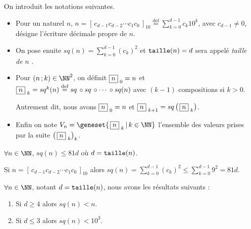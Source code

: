 On introduit les notations suivantes.
\begin{itemize}[label = \textbullet]
	\item Pour un naturel $n$,
	$\displaystyle      n =  \left[ \, c_{d-1} c_{d-2} \cdots c_1 c_0 \, \right]_{10} 
	\stackrel{\text{def}}{=} \sum_{k=0}^{d-1} c_k 10^k$,
	avec $c_{d-1} \neq 0$, désigne l'écriture décimale propre de $n$.
	
	\item On pose enuite
	$\displaystyle sq(n) = \sum_{k=0}^{d-1} (c_k)^2$
	et
	$\operatorname{\text{\normalfont\texttt{taille}}}(n) = d$ sera appelé \emph{\og taille de $n$ \fg}.


	\item Pour $(n \,; k) \in \NN^2$, on définit 
	$  \fbox{$n$}_{\,\,0} = n$
	et
	$  \fbox{$n$}_{\,\,k} = sq^k(n)
	\stackrel{\text{def}}{=} sq \,\circ sq \,\circ \cdots \,\circ sq(n)$ avec $(k-1)$ compositions si $k > 0$.
	
	
	\smallskip\noindent
	Autrement dit, nous avons
	$\fbox{$n$}_{\,\,0} = n$
	et
	$\fbox{$n$}_{\,\,k+1} = sq \left( \, \fbox{$n$}_{\,\,k} \right)$.


	\item Enfin on note
	$V_n = \geneset{ \, \sqseq{n}{k} \, | \, k \in \NN }$
	l'ensemble des valeurs prises par la suite $\left( \, \fbox{$n$}_{\,\,k} \right)_k$.
\end{itemize}



\bigskip

\begin{fact}
	$\forall n \in \NN$, $sq(n) \leqslant 81 d$ où $d = \operatorname{\text{\normalfont\texttt{taille}}}(n)$.
\end{fact}

\begin{proof*}
	Si $n = \left[ \, c_{d-1} c_{d-2} \cdots c_1 c_0 \, \right]_{10}$
	alors 
	$\displaystyle sq(n) = \sum_{k=0}^{d-1} (c_k)^2 \leqslant \sum_{k=0}^{d-1} 9^2 = 81 d $.
\end{proof*}




\medskip

\begin{fact}\label{magicmajo}
	$\forall n \in \NN$, notant $d = \operatorname{\text{\normalfont\texttt{taille}}}(n)$, nous avons les résultats suivants :
	
	\begin{enumerate}
		\item Si $d \geqslant 4$ alors $sq(n) < n$.
		
		\item Si $d \leqslant 3$ alors $sq(n) < 10^3$.
	\end{enumerate}
\end{fact}

